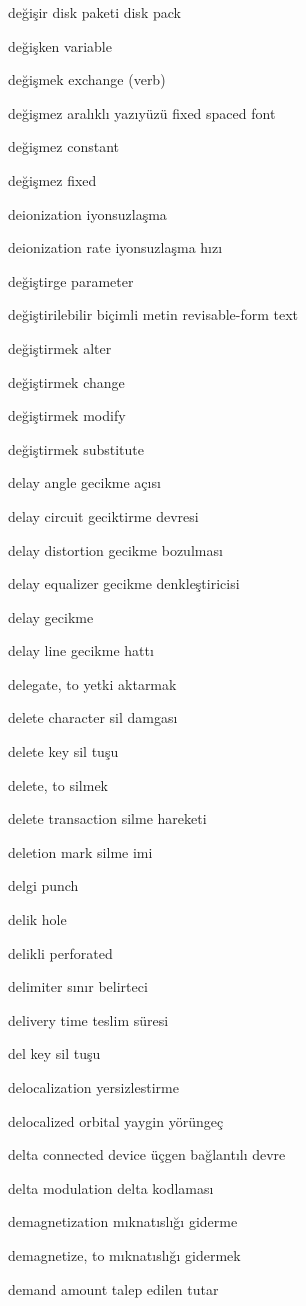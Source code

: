 \documentclass[12pt,fleqn]{article}\usepackage{../../common}
\begin{document}
değişir disk paketi disk pack

değişken variable

değişmek exchange (verb)

değişmez aralıklı yazıyüzü fixed spaced font

değişmez constant

değişmez fixed

deionization iyonsuzlaşma

deionization rate iyonsuzlaşma hızı

değiştirge parameter

değiştirilebilir biçimli metin revisable-form text

değiştirmek alter

değiştirmek change

değiştirmek modify

değiştirmek substitute

delay angle gecikme açısı

delay circuit geciktirme devresi

delay distortion gecikme bozulması

delay equalizer gecikme denkleştiricisi

delay gecikme

delay line gecikme hattı

delegate, to yetki aktarmak

delete character sil damgası

delete key sil tuşu

delete, to silmek

delete transaction silme hareketi

deletion mark silme imi

delgi punch

delik hole

delikli perforated

delimiter sınır belirteci

delivery time teslim süresi

del key sil tuşu

delocalization yersizlestirme

delocalized orbital yaygin yörüngeç

delta connected device üçgen bağlantılı devre

delta modulation delta kodlaması

demagnetization mıknatıslığı giderme

demagnetize, to mıknatıslığı gidermek

demand amount talep edilen tutar
\end{document}
